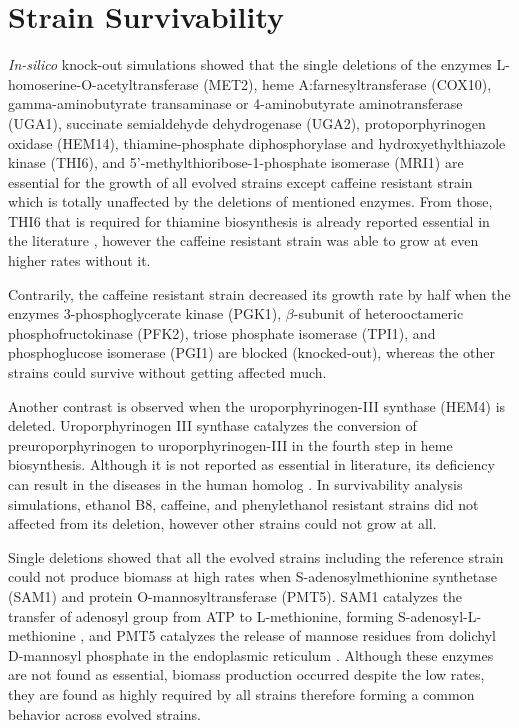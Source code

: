 \section{Strain Survivability}
\emph{In-silico} knock-out simulations showed that the single deletions of the enzymes L-homoserine-O-acetyltransferase (MET2), heme A:farnesyltransferase (COX10), gamma-aminobutyrate transaminase or 4-aminobutyrate aminotransferase (UGA1), succinate semialdehyde dehydrogenase (UGA2), protoporphyrinogen oxidase (HEM14), thiamine-phosphate diphosphorylase and hydroxyethylthiazole kinase (THI6), and 5'-methylthioribose-1-phosphate isomerase (MRI1) are essential for the growth of all evolved strains except caffeine resistant strain which is totally unaffected by the deletions of mentioned enzymes. From those, THI6 that is required for thiamine biosynthesis is already reported essential in the literature \cite{nosaka1994isolation}, however the caffeine resistant strain was able to grow at even higher rates without it.

Contrarily, the caffeine resistant strain decreased its growth rate by half when the enzymes 3-phosphoglycerate kinase (PGK1), $\beta $-subunit of heterooctameric phosphofructokinase (PFK2), triose phosphate isomerase (TPI1), and phosphoglucose isomerase (PGI1) are blocked (knocked-out), whereas the other strains could survive without getting affected much.

Another contrast is observed when the uroporphyrinogen-III synthase (HEM4) is deleted. Uroporphyrinogen III synthase catalyzes the conversion of preuroporphyrinogen to uroporphyrinogen-III in the fourth step in heme biosynthesis\cite{amillet1995isolation}. Although it is not reported as essential in literature, its deficiency can result in the diseases in the human homolog \cite{tan2008identification}. In survivability analysis simulations, ethanol B8, caffeine, and phenylethanol resistant strains did not affected from its deletion, however other strains could not grow at all.

Single deletions showed that all the evolved strains including the reference strain could not produce biomass at high rates when S-adenosylmethionine synthetase (SAM1) and protein O-mannosyltransferase (PMT5). SAM1 catalyzes the transfer of adenosyl group from ATP to L-methionine, forming S-adenosyl-L-methionine \cite{chiang1977activation}, and PMT5 catalyzes the release of mannose residues from dolichyl D-mannosyl phosphate in the endoplasmic reticulum \cite{girrbach2003members}. Although these enzymes are not found as essential, biomass production occurred despite the low rates, they are found as highly required by all strains therefore forming a common behavior across evolved strains.

